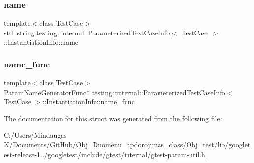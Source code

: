 \mbox{\label{structtesting_1_1internal_1_1_parameterized_test_case_info_1_1_instantiation_info_a299bc66e22b5c78481fda01ef5a4c73d}} 
\subsubsection{\texorpdfstring{name}{name}}
{\footnotesize\ttfamily template$<$class Test\+Case$>$ \\
std\+::string \mbox{\hyperlink{classtesting_1_1internal_1_1_parameterized_test_case_info}{testing\+::internal\+::\+Parameterized\+Test\+Case\+Info}}$<$ \mbox{\hyperlink{classtesting_1_1_test_case}{Test\+Case}} $>$\+::Instantiation\+Info\+::name}

\mbox{\label{structtesting_1_1internal_1_1_parameterized_test_case_info_1_1_instantiation_info_a78a1508dbcc1718bd3dc6001f45ae2ae}} 
\subsubsection{\texorpdfstring{name\_func}{name\_func}}
{\footnotesize\ttfamily template$<$class Test\+Case$>$ \\
\mbox{\hyperlink{classtesting_1_1internal_1_1_parameterized_test_case_info_aed6c5184cb8f94cec73e9d7c4b7fa2ce}{Param\+Name\+Generator\+Func}}$\ast$ \mbox{\hyperlink{classtesting_1_1internal_1_1_parameterized_test_case_info}{testing\+::internal\+::\+Parameterized\+Test\+Case\+Info}}$<$ \mbox{\hyperlink{classtesting_1_1_test_case}{Test\+Case}} $>$\+::Instantiation\+Info\+::name\+\_\+func}



The documentation for this struct was generated from the following file\+:\begin{DoxyCompactItemize}
\item 
C\+:/\+Users/\+Mindaugas K/\+Documents/\+Git\+Hub/\+Obj\+\_\+\+Duomenu\+\_\+apdorojimas\+\_\+class/\+Obj\+\_\+test/lib/googletest-\/release-\/1../googletest/include/gtest/internal/\mbox{\hyperlink{_obj__test_2lib_2googletest-release-1_88_81_2googletest_2include_2gtest_2internal_2gtest-param-util_8h}{gtest-\/param-\/util.\+h}}\end{DoxyCompactItemize}
